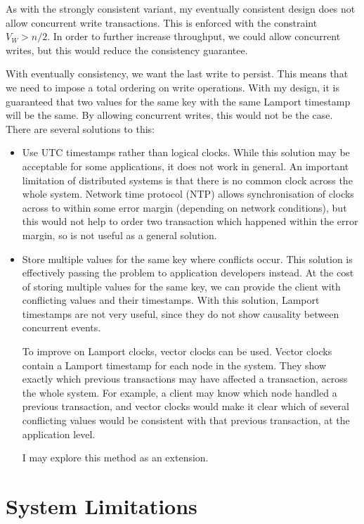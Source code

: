 \documentclass[12pt,a4paper]{article}
\begin{document}
As with the strongly consistent variant, my eventually consistent design does not allow concurrent write transactions. This is enforced with the constraint $V_W > n / 2$. In order to further increase throughput, we could allow concurrent writes, but this would reduce the consistency guarantee.

With eventually consistency, we want the last write to persist. This means that we need to impose a total ordering on write operations. With my design, it is guaranteed that two values for the same key with the same Lamport timestamp will be the same. By allowing concurrent writes, this would not be the case. There are several solutions to this:

\begin{itemize}
  \item
  Use UTC timestamps rather than logical clocks. While this solution may be acceptable for some applications, it does not work in general. An important limitation of distributed systems is that there is no common clock across the whole system. Network time protocol (NTP) allows synchronisation of clocks across to within some error margin (depending on network conditions), but this would not help to order two transaction which happened within the error margin, so is not useful as a general solution.

  \item
  Store multiple values for the same key where conflicts occur. This solution is effectively passing the problem to application developers instead. At the cost of storing multiple values for the same key, we can provide the client with conflicting values and their timestamps. With this solution, Lamport timestamps are not very useful, since they do not show causality between concurrent events.

  To improve on Lamport clocks, vector clocks can be used. Vector clocks contain a Lamport timestamp for each node in the system. They show exactly which previous transactions may have affected a transaction, across the whole system. For example, a client may know which node handled a previous transaction, and vector clocks would make it clear which of several conflicting values would be consistent with that previous transaction, at the application level.

  I may explore this method as an extension.

\end{itemize}

\section*{System Limitations}
\end{document}
